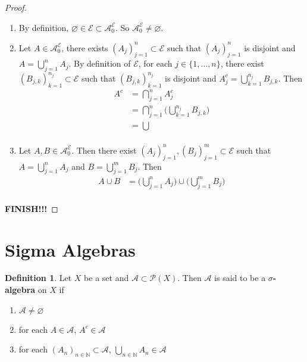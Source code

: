 \documentclass{book}
\theoremstyle{definition}
\newtheorem{defn}[definition]{Definition}
\newcommand{\N}{\mathbb{N}}
\newcommand{\MA}{\mathcal{A}}
\newcommand{\ME}{\mathcal{E}}
\newcommand{\MP}{\mathcal{P}}
\newcommand{\ld}[1]{\label{defn:#1}}
\DeclareMathOperator*{\0}{\mbf{0}}
\DeclareMathOperator*{\1}{\mbf{1}}
\begin{document}
	\begin{proof}\
		\begin{enumerate}
			\item By definition, $\varnothing \in \ME \subset \MA^{\ME}_0$. So $\MA^{\ME}_0 \neq \varnothing$. 
			\item Let $A \in \MA^{\ME}_0$, there exists $(A_j)_{j=1}^n \subset \ME$ such that $(A_j)_{j=1}^n$ is disjoint and $A = \bigcup\limits_{j =1}^n A_j$. By definition of $\ME$, for each $j \in \{1, \ldots, n\}$, there exist $(B_{j,k})_{k=1}^{n_j} \subset \ME$ such that $(B_{j,k})_{k=1}^{n_j}$ is disjoint and $A_j^c = \bigcup\limits_{k=1}^{n_j}B_{j,k}$. Then 
			\begin{align*}
				A^c 
				&= \bigcap_{j=1}^n A_j^c \\
				&= \bigcap_{j=1}^n \bigg( \bigcup\limits_{k=1}^{n_j}B_{j,k} \bigg)\\
				&= \bigcup\\
			\end{align*}	 
			\item Let $A, B \in \MA^{\ME}_0$. Then there exist $(A_j)_{j=1}^n, (B_j)_{j=1}^m \subset \ME$ such that $A = \bigcup\limits_{j=1}^n A_j$ and  $B = \bigcup\limits_{j=1}^m B_j$. Then 
			\begin{align*}
				A \cup B 
				&=  \bigg( \bigcup\limits_{j=1}^n A_j \bigg) \cup \bigg( \bigcup\limits_{j=1}^m B_j \bigg) \\
			\end{align*}
		\end{enumerate}
		\textbf{FINISH!!!}
	\end{proof}

	
























	\newpage
	\section{Sigma Algebras}
		
	\begin{defn} \ld{00000} 
		Let $X$ be a set and $\MA \subset \MP(X)$. Then $\MA$ is said to be a $\sigma$\textbf{-algebra} on $X$ if 
		\begin{enumerate}
			\item $\MA \neq \varnothing$
			\item for each $A \in \MA$, $A^c \in \MA$
			\item for each $(A_n)_{n \in \N} \subset \MA$, $\bigcup\limits_{n \in \N}A_n \in \MA$
		\end{enumerate}
	\end{defn}
	
\end{document}

